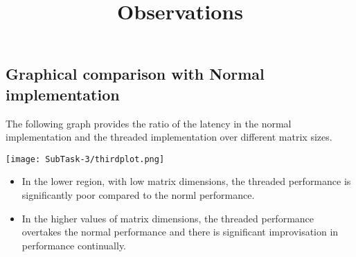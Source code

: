 \documentclass[10pt,a4paper,titlepage]{article}
\begin{document}
\subsection{Graphical comparison with Normal implementation}
The following graph provides the ratio of the latency in the normal implementation and the threaded implementation over different matrix sizes.
\newline
\begin{center}
\texttt{[image: SubTask-3/thirdplot.png]} 
\end{center}
\title{Observations}
\begin{itemize}
\item In the lower region, with low matrix dimensions, the threaded performance is significantly poor compared to the norml performance.
\item In the higher values of matrix dimensions, the threaded performance overtakes the normal performance and there is significant improvisation in performance continually.
\end{itemize}



\end{document}
